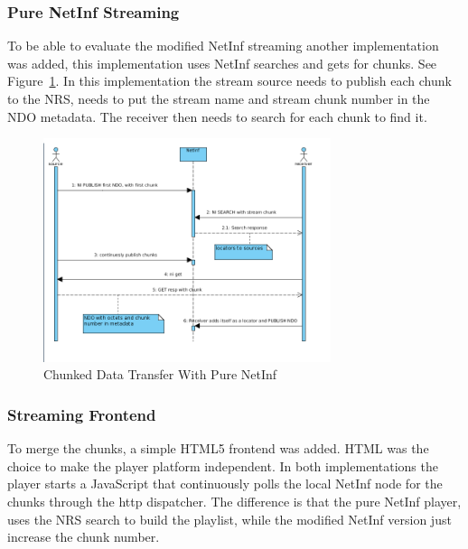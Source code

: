 \subsubsection{Pure NetInf Streaming}
To be able to evaluate the modified NetInf streaming another implementation was added, this implementation uses NetInf searches and gets for chunks. See Figure~\ref{fig:stream-seq-pure}. In this implementation the stream source needs to publish each chunk to the NRS, needs to put the stream name and stream chunk number in the NDO metadata. The receiver then needs to search for each chunk to find it. 

\begin{figure}[h!]
	\centering
		\includegraphics[width=0.75\textwidth]{./img/sequence_diagram_pure_streaming.png}
    	\caption{Chunked Data Transfer With Pure NetInf}
	\label{fig:stream-seq-pure}
\end{figure}

\subsubsection{Streaming Frontend}
To merge the chunks, a simple HTML5 frontend was added. HTML was the choice  to make the player platform independent.
In both implementations the player starts a JavaScript that continuously polls the local NetInf node for the chunks through the http dispatcher.
The difference is that the pure NetInf player, uses the NRS search to build the playlist, while the modified NetInf version just increase the chunk number.

